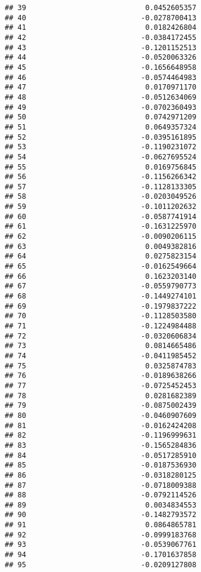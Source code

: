 \documentclass[
]{article}
\begin{document}
\begin{verbatim}
## 39                            0.0452605357
## 40                           -0.0278700413
## 41                            0.0182426804
## 42                           -0.0384172455
## 43                           -0.1201152513
## 44                           -0.0520063326
## 45                           -0.1656648958
## 46                           -0.0574464983
## 47                            0.0170971170
## 48                           -0.0512634069
## 49                           -0.0702360493
## 50                            0.0742971209
## 51                            0.0649357324
## 52                           -0.0395161895
## 53                           -0.1190231072
## 54                           -0.0627695524
## 55                            0.0169756845
## 56                           -0.1156266342
## 57                           -0.1128133305
## 58                           -0.0203049526
## 59                           -0.1011202632
## 60                           -0.0587741914
## 61                           -0.1631225970
## 62                           -0.0090206115
## 63                            0.0049382816
## 64                            0.0275823154
## 65                           -0.0162549664
## 66                            0.1623203140
## 67                           -0.0559790773
## 68                           -0.1449274101
## 69                           -0.1979837222
## 70                           -0.1128503580
## 71                           -0.1224984488
## 72                           -0.0320606834
## 73                            0.0814665486
## 74                           -0.0411985452
## 75                            0.0325874783
## 76                           -0.0189638266
## 77                           -0.0725452453
## 78                            0.0281682389
## 79                           -0.0875002439
## 80                           -0.0460907609
## 81                           -0.0162424208
## 82                           -0.1196999631
## 83                           -0.1565284836
## 84                           -0.0517285910
## 85                           -0.0187536930
## 86                           -0.0318280125
## 87                           -0.0718009388
## 88                           -0.0792114526
## 89                            0.0034834553
## 90                           -0.1482793572
## 91                            0.0864865781
## 92                           -0.0999183768
## 93                           -0.0539067761
## 94                           -0.1701637858
## 95                           -0.0209127808

\end{verbatim}
\end{document}
